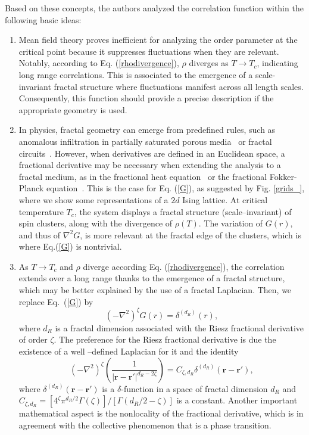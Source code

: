 \documentclass[pre,aps,twocolumn,showpacs,floatfix,nofootinbib,superscriptaddress,linenumbers]{revtex4-1}
\renewcommand{\vec}{\mathbf}
\newcommand{\tr}{ }
\begin{document}
Based on these concepts, the authors analyzed the correlation function within the following basic ideas:
\begin{enumerate}

\item  Mean field theory proves inefficient for analyzing the order parameter at the critical point because it suppresses fluctuations when they are relevant. Notably, according to Eq. (\ref{rhodivergence}), $\rho$ diverges as $T \rightarrow T_c$, indicating long range correlations. This is associated to the emergence of a scale-invariant fractal structure where fluctuations manifest across all length scales. Consequently, this function should provide a precise description if the appropriate geometry is used.

 \item In physics, fractal geometry can emerge from predefined rules, such as anomalous infiltration in partially saturated porous media~\cite{Voller25} or fractal circuits~\cite{Chen17,Boyle07,Anjos24}.  However, when derivatives are defined in an Euclidean space, a fractional derivative may be necessary when extending the analysis to a fractal medium, as in the fractional heat equation~\cite{Angulo00} or the fractional Fokker-Planck equation~\cite{Metzler99,Barkai01,Sokolov01}. This is the case for Eq. (\ref{G}), as suggested by Fig. \ref{grids_}, where we show some representations of a $2d$ Ising lattice. At critical temperature $T_{c}$, the system displays a fractal structure (scale--invariant) of spin clusters, along with the divergence of $\rho(T)$. The variation of $G(r)$, and thus of $\nabla^2 G$, is more relevant at the fractal edge of the clusters, which is where Eq.(\ref{G}) is nontrivial.

\item As $T \rightarrow T_c$ and $\rho$ diverge according Eq. (\ref{rhodivergence}), the correlation extends over a long range thanks to the emergence of a fractal structure, which may be better explained by the use of a fractal Laplacian.  Then, we replace Eq.\ (\ref{G}) by 
\begin{equation}
\label{G3}
(-\nabla^2)^\zeta G(r)=\delta^{(d_R)}(r),
\end{equation}
where $d_R$ is a fractal dimension associated with the Riesz fractional derivative of order $\zeta$. The preference for the Riesz fractional derivative is \tr{due} the existence of a well\tr{--}defined Laplacian for it and the identity ~\cite{Muslih10,Muslih10b}
\begin{equation}
\label{SG3}
(-\nabla^2)^\zeta \left(\frac{1}{|\vec{r}-\vec{r'}|^{d_R-2\zeta}} \right) = C_{\zeta,d_R}  \delta^{(d_R)}(\vec{r}-\vec{r'}),
\end{equation}
where  $\delta^{(d_R)}(\vec{r}-\vec{r'})$ is a $\delta$-function in a space of fractal dimension $d_R$ and $C_{\zeta,d_R}=[4^{\zeta} \pi^{d_R/2} \Gamma(\zeta)]/[ \Gamma(d_R/2-\zeta)]$ is a constant. Another important mathematical aspect is the nonlocality of the fractional derivative, which is in agreement with the  collective phenomenon that is a phase transition.


\end{enumerate}
\end{document}
